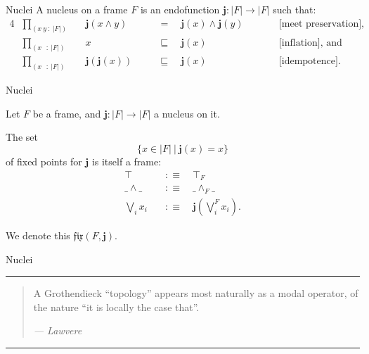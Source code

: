 \documentclass[xcolor={dvipsnames}]{beamer}
\newcommand{\pity}[3]{\prod_{(#1~:~#2)} #3}
\newcommand{\abs}[1]{\left| #1 \right|}
\newcommand{\nuclnm}{\mathbf{j}}
\newcommand{\nuclapp}[1]{\nuclnm{}\left(#1\right)}
\newcommand{\fix}[2]{\mathfrak{fix}\left(#1, #2\right)}
\newcommand{\is}{:\equiv}
\begin{document}
\begin{frame}{Nuclei}
  \large
  A \alert{nucleus} on a frame $F$ is an endofunction $\nuclnm : \abs{F} \rightarrow \abs{F}$ such
  that:
  \begin{alignat*}{4}
    &\pity{x~y}{\abs{F}}{~&& \nuclapp{x \wedge y}       \quad&&=\quad \nuclapp{x} \wedge \nuclapp{y}}
      &&\qquad\text{[meet preservation],}\\
    &\pity{x~~}{\abs{F}}{~&& x                     \quad&&\sqsubseteq\quad \nuclapp{x}}
      &&\qquad\text{[inflation], and}\\
    &\pity{x~~}{\abs{F}}{~&& \nuclapp{\nuclapp{x}} \quad&&\sqsubseteq\quad \nuclapp{x}}
      &&\qquad\text{[idempotence].}
  \end{alignat*}

  \vspace{0.5em}

\end{frame}

\begin{frame}{Nuclei}
  \large

  Let $F$ be a frame, and $\nuclnm{} : \abs{F} \rightarrow \abs{F}$ a nucleus on it.

  \vspace{1em}

  The set
  \begin{equation*}
    \{ x \in \abs{F} ~|~ \nuclapp{x} = x \}
  \end{equation*}
  of \alert{fixed points} for $\nuclnm{}$ is itself a frame:
  \begin{align*}
    \top       \quad&\is\quad \top_F                \\
    \_\wedge\_   \quad&\is\quad \_\wedge_F\_            \\
    \bigvee_i x_i \quad&\is\quad \nuclapp{\bigvee^F_i x_i} .
  \end{align*}

  We denote this $\fix{F}{\nuclnm{}}$.
\end{frame}

\begin{frame}{Nuclei}
  \large

  \hrule
  \begin{quote}
    A Grothendieck ``topology'' appears most naturally as a modal operator, of the nature
    ``it is locally the case that''.
    \begin{flushright}
      \emph{--- Lawvere~\cite{quantifiers-and-sheaves}}
    \end{flushright}
  \end{quote}
  \hrule

  \vspace{1.5em}

\end{frame}
\end{document}
